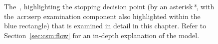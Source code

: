 \begin{figure}[t!]
    \centering
    \caption[The~\gls{acr:csm} and~\gls{acr:serp} stopping point]{The~, highlighting the stopping decision point (by an asterisk\emph{*}, with the~\gls{acr:serp} examination component also highlighted within the blue rectangle) that is examined in detail in this chapter. Refer to Section~\ref{sec:csm:flow} for an in-depth explanation of the model.}
    \label{fig:csm_ch9}
\end{figure}


